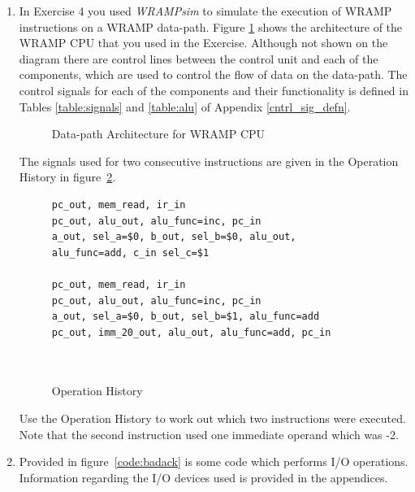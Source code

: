 \documentclass[a4paper,10pt]{article}
\begin{document}
\begin{enumerate}
\item  In Exercise 4 you used \emph{WRAMPsim} to simulate the
execution of WRAMP instructions on a WRAMP data-path. Figure
\ref{fig:wrampblok} shows the architecture of the WRAMP CPU that
you used in the Exercise. Although not shown on the diagram there are
control lines between the control unit and each of the components,
which are used to control the flow of data on the data-path. The
control signals for each of the components and their functionality is
defined in Tables \ref{table:signals} and
\ref{table:alu} of Appendix \ref{cntrl_sig_defn}. 

\begin{figure}[h]
\begin{center}
    \caption{Data-path Architecture for WRAMP CPU}
    \label{fig:wrampblok}
  \end{center}
\end{figure}

The signals used for two consecutive instructions are given in the Operation History in figure~\ref{fig:hist}.

\begin{figure}[h]
\begin{small}
\begin{center}
\begin{verbatim}
pc_out, mem_read, ir_in
pc_out, alu_out, alu_func=inc, pc_in
a_out, sel_a=$0, b_out, sel_b=$0, alu_out, alu_func=add, c_in sel_c=$1

pc_out, mem_read, ir_in
pc_out, alu_out, alu_func=inc, pc_in
a_out, sel_a=$0, b_out, sel_b=$1, alu_func=add
pc_out, imm_20_out, alu_out, alu_func=add, pc_in

 
\end{verbatim}
\end{center}
\end{small}
\caption{Operation History}
\label{fig:hist}
\end{figure}

Use the Operation History to work out which two instructions were executed.  Note that the second instruction used one immediate operand which was -2.




\newpage 

\item Provided in figure~\ref{code:badack} is some code which performs I/O operations.  Information regarding the I/O devices used is provided in the appendices.


\end{enumerate}
\end{document}
